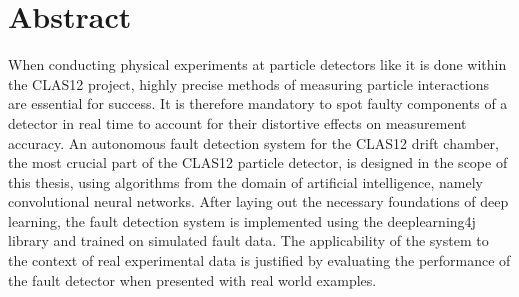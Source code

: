 \chapter*{Abstract}
\thispagestyle{empty}

When conducting physical experiments at particle detectors like it is
done within the CLAS12 project, highly precise methods of measuring
particle interactions are essential for success. It is therefore
mandatory to spot faulty components of a detector in real time to
account for their distortive effects on measurement accuracy. An
autonomous fault detection system for the CLAS12 drift chamber, the
most crucial part of the CLAS12 particle detector, is
designed in the scope of this thesis, using algorithms from the
domain of artificial intelligence, namely convolutional neural
networks. After laying out the necessary foundations of deep
learning, the fault detection system is implemented using the
deeplearning4j library and trained on simulated fault data. The
applicability of the system to the context of real experimental data
is justified by evaluating the performance of the fault detector when
presented with real world examples.
